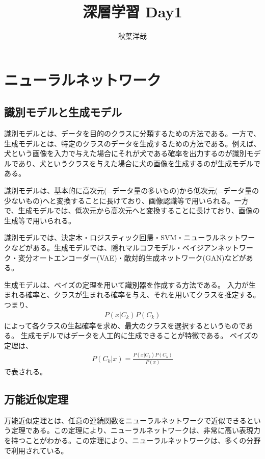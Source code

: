 \documentclass{ltjsarticle}
\begin{document}
\title{深層学習 Day1}
\author{秋葉洋哉}
\maketitle

\section{ニューラルネットワーク}
\subsection{識別モデルと生成モデル}
識別モデルとは、データを目的のクラスに分類するための方法である。一方で、生成モデルとは、特定のクラスのデータを生成するための方法である。例えば、犬という画像を入力で与えた場合にそれが犬である確率を出力するのが識別モデルであり、犬というクラスを与えた場合に犬の画像を生成するのが生成モデルである。
\par
識別モデルは、基本的に高次元(=データ量の多いもの)から低次元(=データ量の少ないもの)へと変換することに長けており、画像認識等で用いられる。一方で、生成モデルでは、低次元から高次元へと変換することに長けており、画像の生成等で用いられる。
\par
識別モデルでは、決定木・ロジスティック回帰・SVM・ニューラルネットワークなどがある。生成モデルでは、隠れマルコフモデル・ベイジアンネットワーク・変分オートエンコーダー(VAE)・敵対的生成ネットワーク(GAN)などがある。
\par
生成モデルは、ベイズの定理を用いて識別器を作成する方法である。
入力が生まれる確率と、クラスが生まれる確率を与え、それを用いてクラスを推定する。つまり、
\begin{align}
  P(x|C_k)P(C_k)
\end{align}
によって各クラスの生起確率を求め、最大のクラスを選択するというものである。
生成モデルではデータを人工的に生成できることが特徴である。
ベイズの定理は、
\begin{align}
  P(C_k|x) = \frac{P(x|C_k)P(C_k)}{P(x)}
\end{align}
で表される。

\subsection{万能近似定理}
万能近似定理とは、任意の連続関数をニューラルネットワークで近似できるという定理である。この定理により、ニューラルネットワークは、非常に高い表現力を持つことがわかる。この定理により、ニューラルネットワークは、多くの分野で利用されている。
\end{document}
